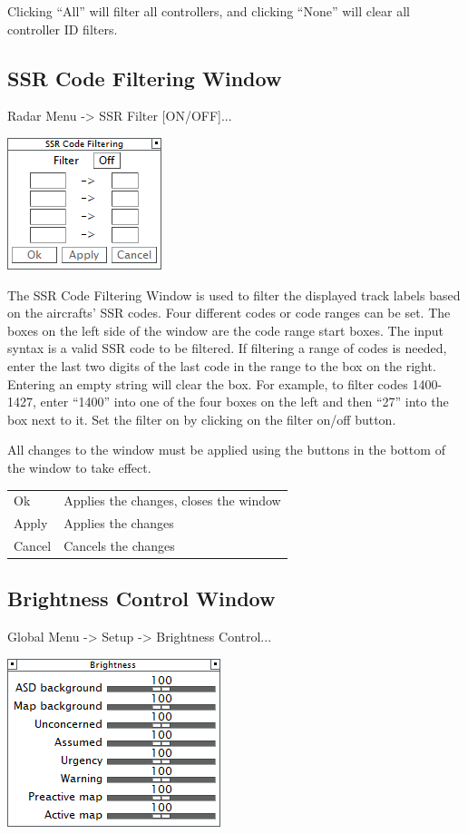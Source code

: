 \documentclass[11pt,a4paper]{memoir}
\begin{document}
Clicking “All” will filter all controllers, and clicking “None” will clear all controller ID filters.

\subsection{SSR Code Filtering Window}
\label{win:ssr}

Radar Menu -> SSR Filter [ON/OFF]...

\includegraphics{img/ssrfil.png}

The SSR Code Filtering Window is used to filter the displayed track labels based on the aircrafts’ SSR codes. Four different codes or code ranges can be set. The boxes on the left side of the window are the code range start boxes. The input syntax is a valid SSR code to be filtered. If filtering a range of codes is needed, enter the last two digits of the last code in the range to the box on the right. Entering an empty string will clear the box. For example, to filter codes 1400-1427, enter “1400” into one of the four boxes on the left and then “27” into the box next to it. Set the filter on by clicking on the filter on/off button.

All changes to the window must be applied using the buttons in the bottom of the window to take effect.

\begin{tabular}{l l}
    Ok      & Applies the changes, closes the window\\
    Apply   & Applies the changes\\
    Cancel  & Cancels the changes\\
\end{tabular}

\subsection{Brightness Control Window}
\label{win:bcw}

Global Menu -> Setup -> Brightness Control...

\includegraphics{img/bright.png}
\end{document}
